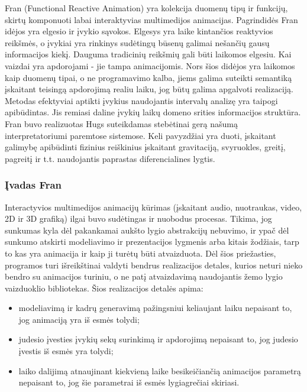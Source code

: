 Fran (Functional Reactive Animation) yra kolekcija duomenų tipų ir funkcijų, skirtų komponuoti labai interaktyvias multimedijos animacijas. Pagrindidės Fran idėjos yra elgesio ir įvykio sąvokos. Elgesys yra laike kintančios reaktyvios reikšmės, o įvykiai yra rinkinys sudėtingų būsenų galimai nešančių gausų informacijos kiekį. Dauguma tradicinių reikšmių gali būti laikomos elgesiu. Kai vaizdai yra apdorojami - jie tampa animacijomis. Nors šios didėjos yra laikomos kaip duomenų tipai, o ne programavimo kalba, jiems galima suteikti semantiką įskaitant teisingą apdorojimą realiu laiku, jog būtų galima apgalvoti realizaciją. Metodas efektyviai aptikti įvykius  naudojantis intervalų analizę yra taipogi apibūdintas. Jis remiasi daline įvykių laikų domeno srities informacijos struktūra. Fran buvo realizuotas Hugs suteikdamas stebėtinai gerą našumą interpretatoriumi paremtose sistemose. Keli pavyzdžiai yra duoti, įskaitant galimybę apibūdinti fizinius reiškinius įskaitant gravitaciją, svyruokles, greitį, pagreitį ir t.t. naudojantis paprastas diferencialines lygtis.

\subsubsection{Įvadas Fran}

Interactyvios multimedijos animacijų kūrimas (įskaitant audio, nuotraukas, video, 2D ir 3D grafiką) ilgai buvo sudėtingas ir nuobodus procesas. Tikima, jog sunkumas kyla dėl pakankamai aukšto lygio abstrakcijų nebuvimo, ir ypač dėl sunkumo atskirti modeliavimo ir prezentacijos lygmenis arba kitais žodžiais, tarp to kas yra animacija ir kaip ji turėtų būti atvaizduota. Dėl šios priežasties, programos turi išreikštinai valdyti bendrus realizacijos detales, kurios neturi nieko bendro su animacijos turiniu, o ne patį atvaizdavimą naudojantis žemo lygio vaizduoklio bibliotekas. Šios realizacijos detalės apima:

\begin{itemize}

	\item modeliavimą ir kadrų generavimą pažingsniui keliaujant laiku nepaisant to, jog animaciją yra iš esmės tolydi;

	\item judesio įvesties įvykių sekų surinkimą ir apdorojimą nepaisant to, jog judesio įvestis iš esmės yra tolydi;

	\item laiko dalijimą atnaujinant kiekvieną laike besikeičiančią animacijos parametrą nepaisant to, jog šie parametrai iš esmės lygiagrečiai skiriasi.

\end{itemize} 

